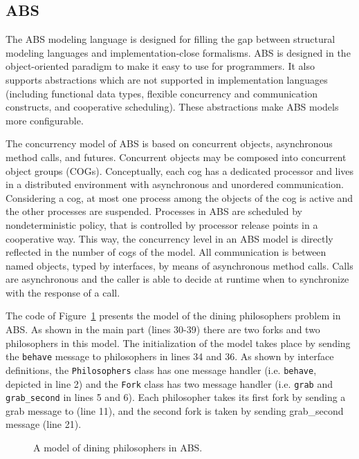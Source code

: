 \subsection{ABS}

The ABS modeling language \cite{DBLP:conf/fmco/JohnsenHSSS10} is designed for filling the gap between structural modeling languages and implementation-close formalisms. ABS is designed in the object-oriented paradigm to make it easy to use for programmers. It also supports abstractions which are not supported in implementation languages (including functional data types, flexible concurrency and communication constructs, and cooperative scheduling). These abstractions make ABS models more configurable. 

The concurrency model of ABS is based on concurrent objects, asynchronous method calls, and futures. Concurrent objects may be composed into concurrent object groups (COGs). Conceptually, each cog has a dedicated processor and lives in a distributed environment with asynchronous and unordered communication. Considering a cog, at most one process among the objects of the cog is active and the other processes are suspended. Processes in ABS are scheduled by nondeterministic policy, that is controlled by processor release points in a cooperative way. This way, the concurrency level in an ABS model is directly reflected in the number of cogs of the model. All communication is between named objects, typed by interfaces, by means of asynchronous method calls. Calls are asynchronous and the caller is able to decide at runtime when to synchronize with the response of a call.

\begin{example}
The code of Figure~\ref{fig:abs:phils} presents the model of the dining philosophers problem in ABS. As shown in the main part (lines 30-39) there are two forks and two philosophers in this model. The initialization of the model takes place by sending the \texttt{behave} message to philosophers in lines 34 and 36. As shown by interface definitions, the \texttt{Philosophers} class has one message handler (i.e. \texttt{behave}, depicted in line 2) and the \texttt{Fork} class has two message handler (i.e. \texttt{grab} and \texttt{grab_second} in lines 5 and 6). Each philosopher takes its first fork by sending a grab message to (line 11), and the second fork is taken by sending grab_second message (line 21).
\end{example}
\begin{figure}[h]
	\centering
	
	\caption{A model of dining philosophers in  ABS.}
	\label{fig:abs:phils}
\end{figure}

